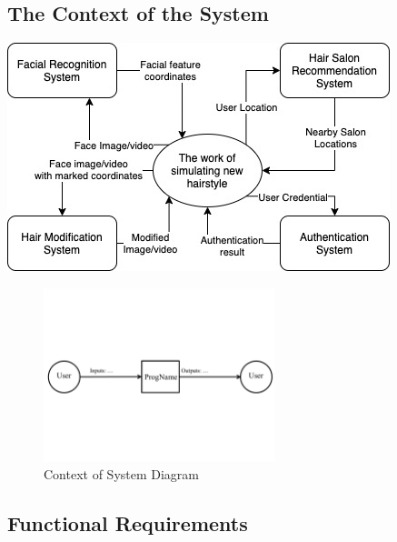 \documentclass[12pt]{article}
\begin{document}
\subsection{The Context of the System}
\graphicspath{ {./system_context_diagram.jpg/} }
\includegraphics[width=\textwidth]{system_context_diagram}
\begin{figure}[h!]
\begin{center}
 \includegraphics[width=0.6\textwidth]{SystemContextFigure}
\caption{Context of System Diagram}
\end{center}
\end{figure}

\subsection{Functional Requirements }
\end{document}
